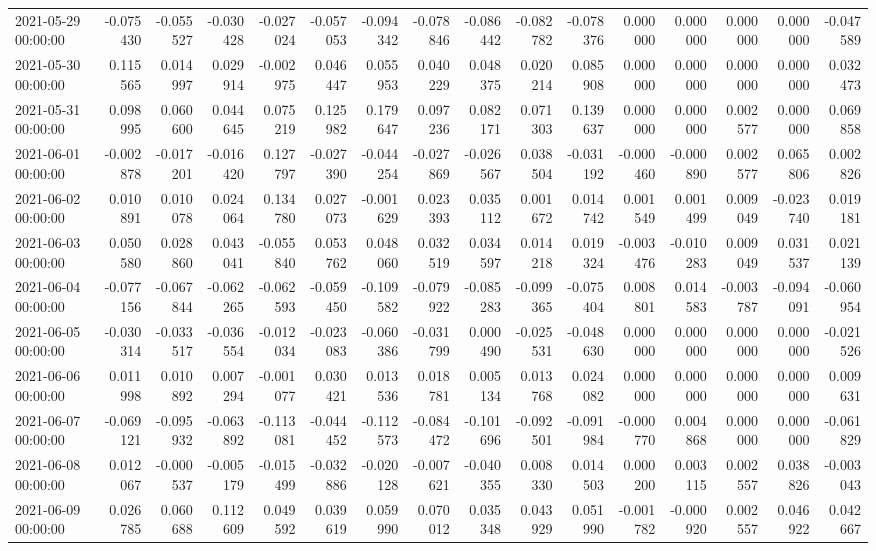 \begin{tabular}{lrrrrrrrrrrrrrrr}
2021-05-29 00:00:00 & -0.075430 & -0.055527 & -0.030428 & -0.027024 & -0.057053 & -0.094342 & -0.078846 & -0.086442 & -0.082782 & -0.078376 & 0.000000 & 0.000000 & 0.000000 & 0.000000 & -0.047589 \\
2021-05-30 00:00:00 & 0.115565 & 0.014997 & 0.029914 & -0.002975 & 0.046447 & 0.055953 & 0.040229 & 0.048375 & 0.020214 & 0.085908 & 0.000000 & 0.000000 & 0.000000 & 0.000000 & 0.032473 \\
2021-05-31 00:00:00 & 0.098995 & 0.060600 & 0.044645 & 0.075219 & 0.125982 & 0.179647 & 0.097236 & 0.082171 & 0.071303 & 0.139637 & 0.000000 & 0.000000 & 0.002577 & 0.000000 & 0.069858 \\
2021-06-01 00:00:00 & -0.002878 & -0.017201 & -0.016420 & 0.127797 & -0.027390 & -0.044254 & -0.027869 & -0.026567 & 0.038504 & -0.031192 & -0.000460 & -0.000890 & 0.002577 & 0.065806 & 0.002826 \\
2021-06-02 00:00:00 & 0.010891 & 0.010078 & 0.024064 & 0.134780 & 0.027073 & -0.001629 & 0.023393 & 0.035112 & 0.001672 & 0.014742 & 0.001549 & 0.001499 & 0.009049 & -0.023740 & 0.019181 \\
2021-06-03 00:00:00 & 0.050580 & 0.028860 & 0.043041 & -0.055840 & 0.053762 & 0.048060 & 0.032519 & 0.034597 & 0.014218 & 0.019324 & -0.003476 & -0.010283 & 0.009049 & 0.031537 & 0.021139 \\
2021-06-04 00:00:00 & -0.077156 & -0.067844 & -0.062265 & -0.062593 & -0.059450 & -0.109582 & -0.079922 & -0.085283 & -0.099365 & -0.075404 & 0.008801 & 0.014583 & -0.003787 & -0.094091 & -0.060954 \\
2021-06-05 00:00:00 & -0.030314 & -0.033517 & -0.036554 & -0.012034 & -0.023083 & -0.060386 & -0.031799 & 0.000490 & -0.025531 & -0.048630 & 0.000000 & 0.000000 & 0.000000 & 0.000000 & -0.021526 \\
2021-06-06 00:00:00 & 0.011998 & 0.010892 & 0.007294 & -0.001077 & 0.030421 & 0.013536 & 0.018781 & 0.005134 & 0.013768 & 0.024082 & 0.000000 & 0.000000 & 0.000000 & 0.000000 & 0.009631 \\
2021-06-07 00:00:00 & -0.069121 & -0.095932 & -0.063892 & -0.113081 & -0.044452 & -0.112573 & -0.084472 & -0.101696 & -0.092501 & -0.091984 & -0.000770 & 0.004868 & 0.000000 & 0.000000 & -0.061829 \\
2021-06-08 00:00:00 & 0.012067 & -0.000537 & -0.005179 & -0.015499 & -0.032886 & -0.020128 & -0.007621 & -0.040355 & 0.008330 & 0.014503 & 0.000200 & 0.003115 & 0.002557 & 0.038826 & -0.003043 \\
2021-06-09 00:00:00 & 0.026785 & 0.060688 & 0.112609 & 0.049592 & 0.039619 & 0.059990 & 0.070012 & 0.035348 & 0.043929 & 0.051990 & -0.001782 & -0.000920 & 0.002557 & 0.046922 & 0.042667 \\

\end{tabular}

